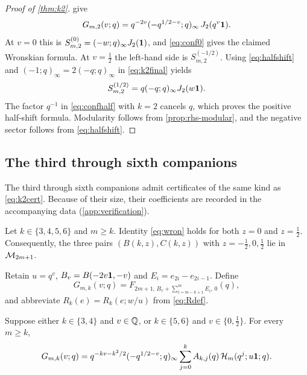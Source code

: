 \begin{proof}[Proof of \cref{thm:k2}]
 give
\begin{equation}\label{eq:k2final}
G_{m,2}(v;q)=q^{-2v}(-q^{1/2-v};q)_\infty\,J_2(q^v\mathbf{1}).
\end{equation}
At $v=0$ this is $S^{(0)}_{m,2}=(-w;q)_\infty J_2(\mathbf{1})$, and \eqref{eq:conf0} gives the claimed Wronskian formula. At $v=\frac12$ the left-hand side is $S^{(-1/2)}_{m,2}$. Using \eqref{eq:halfshift} and $(-1;q)_\infty=2(-q;q)_\infty$ in \eqref{eq:k2final} yields
\[
S^{(1/2)}_{m,2}=q(-q;q)_\infty J_2(w\mathbf{1}).
\]
The factor $q^{-1}$ in \eqref{eq:confhalf} with $k=2$ cancels $q$, which proves the positive half-shift formula. Modularity follows from \cref{prop:rhs-modular}, and the negative sector follows from \eqref{eq:halfshift}.
\end{proof}

\subsection{The third through sixth companions}
The third through sixth companions admit certificates of the same kind as \eqref{eq:k2cert}. Because of their size, their coefficients are recorded in the accompanying data (\cref{app:verification}).

\begin{theorem}\label{thm:k3to6}
Let $k\in\{3,4,5,6\}$ and $m\ge k$. Identity \eqref{eq:wron} holds for both $z=0$ and $z=\frac12$. Consequently, the three pairs $(B(k,z),C(k,z))$ with $z=-\frac12,0,\frac12$ lie in $\mathcal{M}_{2m+1}$.
\end{theorem}

Retain $u=q^v$, $B_v=B(-2v\mathbf{1},-v)$ and $E_i=e_{2i}-e_{2i-1}$. Define
\[
G_{m,k}(v;q)=F_{2m+1,\,B_v+\sum_{i=m-k+1}^mE_i,\,0}(q),
\]
and abbreviate $R_k(e)=R_k(e;w/u)$ from \eqref{eq:Rdef}.

\begin{lemma}\label{lem:certred}
Suppose either $k\in\{3,4\}$ and $v\in\mathbb{Q}$, or $k\in\{5,6\}$ and $v\in\{0,\frac12\}$. For every $m\ge k$,
\begin{equation}\label{eq:certred}
G_{m,k}(v;q)=q^{-kv-k^2/2}(-q^{1/2-v};q)_\infty\sum_{j=0}^kA_{k,j}(q)\,\mathcal{H}_m(q^j;u\mathbf{1};q).
\end{equation}
\end{lemma}

